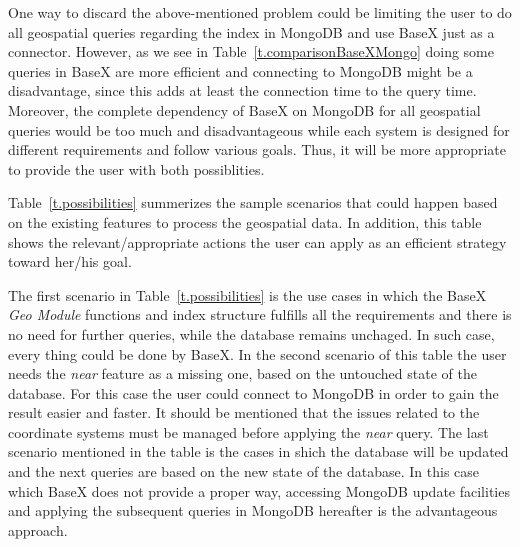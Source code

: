 \documentclass[a4paper,12pt]{article}
\begin{document}
One way to discard the above-mentioned problem could be limiting the user to do all geospatial queries regarding the index in MongoDB and use BaseX just as a connector. 
However, as we see in Table~\ref{t.comparisonBaseXMongo} doing some queries in BaseX are more efficient and connecting to MongoDB might be a disadvantage, since this adds at least the connection time to the query time. Moreover, the complete dependency of BaseX on MongoDB for all geospatial queries would be too much and disadvantageous while each system is designed for different requirements and follow various goals. 
Thus, it will be more appropriate to provide the user with both possiblities.

Table~\ref{t.possibilities} summerizes the sample scenarios that could happen based on the existing features to process the geospatial data. In addition, this table shows the relevant/appropriate actions the user can apply as an efficient strategy toward her/his goal.


\begin{table}
\centering
{}
\caption{Possible scenarios and appropriate actions suggested to take}
\label{t.possibilities}
\end{table}

The first scenario in Table~\ref{t.possibilities} is the use cases in which the BaseX \textit{Geo Module} functions and index structure fulfills all the requirements and there is no need for further queries, while the database remains unchaged. In such case, every thing could be done by BaseX. In the second scenario of this table the user needs the \textit{near} feature as a missing one, based on the untouched state of the database. For this case the user could connect to MongoDB in order to gain the result easier and faster. It should be mentioned that the issues related to the coordinate systems must be managed before applying the \textit{near} query. The last scenario mentioned in the table is the cases in shich the database will be updated and the next queries are based on the new state of the database. In this case which BaseX does not provide a proper way, accessing MongoDB update facilities and applying the subsequent queries in MongoDB hereafter is the advantageous approach. 
\end{document}
